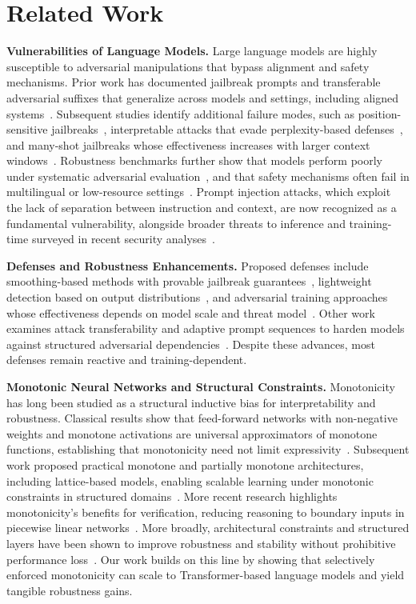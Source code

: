\documentclass{article}
\theoremstyle{plain}
\theoremstyle{definition}
\theoremstyle{remark}
\begin{document}
\section{Related Work}

\textbf{Vulnerabilities of Language Models.}
Large language models are highly susceptible to adversarial manipulations that bypass alignment and safety mechanisms. Prior work has documented jailbreak prompts and transferable adversarial suffixes that generalize across models and settings, including aligned systems~\citep{Zou2023UniversalTransferableAttacksOnAlignedLLMs}. Subsequent studies identify additional failure modes, such as position-sensitive jailbreaks~\citep{wang2025vulnerability}, interpretable attacks that evade perplexity-based defenses~\citep{Zhu2023AutoDAN}, and many-shot jailbreaks whose effectiveness increases with larger context windows~\citep{anil2024many}. Robustness benchmarks further show that models perform poorly under systematic adversarial evaluation~\citep{Wang2021AdvGLUE}, and that safety mechanisms often fail in multilingual or low-resource settings~\citep{deng2024multilingual}. Prompt injection attacks, which exploit the lack of separation between instruction and context, are now recognized as a fundamental vulnerability, alongside broader threats to inference and training-time surveyed in recent security analyses~\citep{li2025security}.

\textbf{Defenses and Robustness Enhancements.}
Proposed defenses include smoothing-based methods with provable jailbreak guarantees~\citep{Robey2023SmoothLLM}, lightweight detection based on output distributions~\citep{sayeedi2025jailbreaktracer}, and adversarial training approaches whose effectiveness depends on model scale and threat model~\citep{howe2024effects}. Other work examines attack transferability and adaptive prompt sequences to harden models against structured adversarial dependencies~\citep{wang2025understanding}. Despite these advances, most defenses remain reactive and training-dependent.

\textbf{Monotonic Neural Networks and Structural Constraints.}
Monotonicity has long been studied as a structural inductive bias for interpretability and robustness. Classical results show that feed-forward networks with non-negative weights and monotone activations are universal approximators of monotone functions, establishing that monotonicity need not limit expressivity~\citep{Sill1998MonotonicNetworks,Daniels2010Monotone}. Subsequent work proposed practical monotone and partially monotone architectures, including lattice-based models, enabling scalable learning under monotonic constraints in structured domains~\citep{Gupta2016MonotonicLattices,You2017DeepLattice}. More recent research highlights monotonicity’s benefits for verification, reducing reasoning to boundary inputs in piecewise linear networks~\citep{Weber2021CertifyingMonotonicNetworks}. More broadly, architectural constraints and structured layers have been shown to improve robustness and stability without prohibitive performance loss~\citep{Amos2017OptNet}. Our work builds on this line by showing that selectively enforced monotonicity can scale to Transformer-based language models and yield tangible robustness gains.
\end{document}
